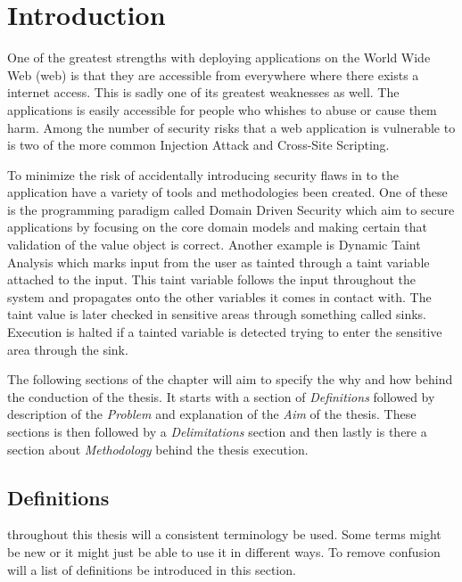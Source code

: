 \chapter{Introduction}
One of the greatest strengths with deploying applications on the World Wide Web (web) is that they are accessible from everywhere where there exists a internet access. This is sadly one of its greatest weaknesses as well. The applications is easily accessible for people who whishes to abuse or cause them harm. Among the number of security risks that a web application is vulnerable to is two of the more common Injection Attack and Cross-Site Scripting. \parencite{OpenWebApplicationSecurityProject, CrossMichael2007Dgtw}

To minimize the risk of accidentally introducing security flaws in to the application have a variety of tools and methodologies been created. One of these is the programming paradigm called Domain Driven Security which aim to secure applications by focusing on the core domain models and making certain that validation of the value object is correct. \parencite{sbd2018, Wilander2009, Johnsson2009} Another example is Dynamic Taint Analysis which marks input from the user as tainted through a taint variable attached to the input. This taint variable follows the input throughout the system and propagates onto the other variables it comes in contact with. The taint value is later checked in sensitive areas through something called sinks. Execution is halted if a tainted variable is detected trying to enter the sensitive area through the sink. \parencite{Pan2015, Venkataramani2008}

The following sections of the chapter will aim to specify the why and how behind the conduction of the thesis. It starts with a section of \textit{Definitions} followed by description of the \textit{Problem} and explanation of the \textit{Aim} of the thesis. These sections is then followed by a \textit{Delimitations} section and then lastly is there a section about \textit{Methodology} behind the thesis execution.


\section{Definitions}
throughout this thesis will a consistent terminology be used. Some terms might be new or it might just be able to use it in different ways. To remove confusion will a list of definitions be introduced in this section.

